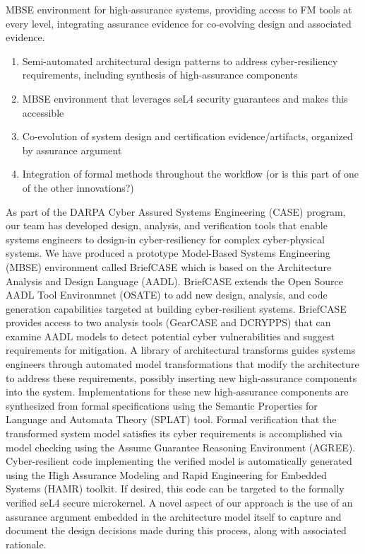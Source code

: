 
MBSE environment for high-assurance systems, providing access to FM tools at every level, integrating assurance evidence for co-evolving design and associated evidence.

\begin{enumerate}
\item Semi-automated architectural design patterns to address cyber-resiliency requirements, including synthesis of high-assurance components
\item MBSE environment that leverages seL4 security guarantees and makes this accessible
\item Co-evolution of system design and certification evidence/artifacts, organized by assurance argument
\item Integration of formal methods throughout the workflow (or is this part of one of the other innovations?)
\end{enumerate}

As part of the DARPA Cyber Assured Systems Engineering (CASE) program,
our team has developed design, analysis, and verification
tools that enable systems engineers to design-in cyber-resiliency
for complex cyber-physical systems. We have produced a prototype
Model-Based Systems Engineering (MBSE) environment called
BriefCASE which is based on the Architecture Analysis and Design
Language (AADL). BriefCASE extends the Open Source AADL
Tool Environmnet (OSATE) to add new design, analysis, and code
generation capabilities targeted at building cyber-resilient systems.
BriefCASE provides access to two analysis tools (GearCASE 
and DCRYPPS) that can examine AADL models to detect potential
cyber vulnerabilities and suggest requirements for mitigation.
A library of architectural transforms guides systems engineers
through automated model transformations that modify the
architecture to address these requirements, possibly inserting new
high-assurance components into the system. Implementations for
these new high-assurance components are synthesized from formal
specifications using the Semantic Properties for Language and
Automata Theory (SPLAT) tool. Formal verification that the
transformed system model satisfies its cyber requirements is accomplished
via model checking using the Assume Guarantee Reasoning
Environment (AGREE). Cyber-resilient code implementing the
verified model is automatically generated using the High Assurance
Modeling and Rapid Engineering for Embedded Systems (HAMR)
toolkit. If desired, this code can be targeted to the formally
verified seL4 secure microkernel.
A novel aspect of our approach is the use of an assurance argument
embedded in the architecture model itself to capture and
document the design decisions made during this process, along
with associated rationale.
